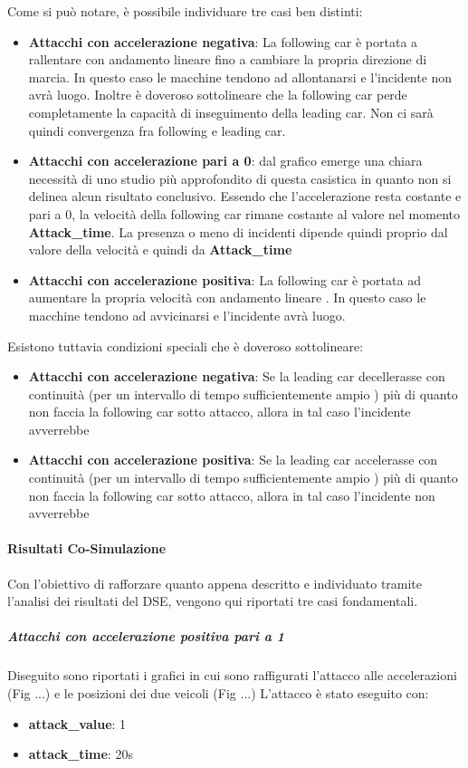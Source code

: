 Come si può notare, è possibile individuare tre casi ben distinti:
\begin{itemize}
	\item \textbf{Attacchi con accelerazione negativa}: La following car è portata a rallentare con andamento lineare fino a cambiare la propria direzione di marcia. In questo caso le macchine tendono ad allontanarsi e l'incidente non avrà luogo. Inoltre è doveroso sottolineare che la following car perde completamente la capacità di inseguimento della leading car. Non ci sarà quindi convergenza fra following e leading car.
	\item \textbf{Attacchi con accelerazione pari a 0}: dal grafico emerge una chiara necessità di uno studio più approfondito di questa casistica in quanto non si delinea alcun risultato conclusivo. Essendo che l'accelerazione resta costante e pari a 0, la velocità della following car rimane costante al valore nel momento \textbf{Attack\_time}. La presenza o meno di incidenti dipende quindi proprio dal valore della velocità e quindi da \textbf{Attack\_time}
	\item \textbf{Attacchi con accelerazione positiva}: La following car è portata ad aumentare la propria velocità con andamento lineare . In questo caso le macchine tendono ad avvicinarsi e l'incidente avrà luogo.
\end{itemize}
Esistono tuttavia condizioni speciali che è doveroso sottolineare:
\begin{itemize}
	\item \textbf{Attacchi con accelerazione negativa}: Se la leading car decellerasse con continuità (per un intervallo di tempo sufficientemente ampio ) più di quanto non faccia la following car sotto attacco, allora in tal caso l'incidente avverrebbe
	\item \textbf{Attacchi con accelerazione positiva}: Se la leading car accelerasse con continuità (per un intervallo di tempo sufficientemente ampio ) più di quanto non faccia la following car sotto attacco, allora in tal caso l'incidente non avverrebbe
\end{itemize}
\paragraph{Risultati Co-Simulazione}
Con l'obiettivo di rafforzare quanto appena descritto  e individuato tramite l'analisi dei risultati del DSE, vengono qui riportati tre casi fondamentali.
\subparagraph{Attacchi con accelerazione positiva pari a 1} Diseguito sono riportati i grafici in cui sono raffigurati l'attacco alle accelerazioni (Fig ...) e le posizioni dei due veicoli (Fig ...)
L'attacco è stato eseguito con:
\begin{itemize}
	\item \textbf{attack\_value}: 1
	\item \textbf{attack\_time}: 20s
\end{itemize}


